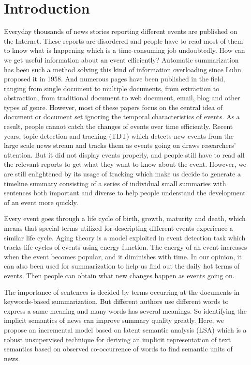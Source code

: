 \documentclass[runningheads,a4paper]{llncs}
\begin{document}
\section{Introduction}

Everyday thousands of news stories reporting different events are published on the Internet. These reports are disordered and people have to read most of them to know what is happening which is a time-consuming job undoubtedly. How can we get useful information about an event efficiently? Automatic summarization has been such a method solving this kind of information overloading since Luhn \cite{1958-Luhn-p159-165} proposed it in 1958. And numerous pages have been published in the field, ranging from single document to multiple documents, from extraction to abstraction, from traditional document to web document, email, blog and other types of genre. However, most of these papers focus on the central idea of document or document set ignoring the temporal characteristics of events. As a result, people cannot catch the changes of events over time efficiently. 
Recent years, topic detection and tracking (TDT) which detects new events from the large scale news stream and tracks them as events going on draws researchers' attention. But it did not display events properly, and people still have to read all the relevant reports to get what they want to know about the event. However, we are still enlightened by its usage of tracking which make us decide to generate a timeline summary consisting of a series of individual small summaries with sentences both important and diverse to help people understand the development of an event more quickly.

Every event goes through a life cycle of birth, growth, maturity and death, which means that special terms utilized for descripting different events experience a similar life cycle. Aging theory \cite{2003-Chen-p47-59} is a model exploited in event detection task which tracks life cycles of events using energy function. The energy of an event increases when the event becomes popular, and it diminishes with time. In our opinion, it can also been used for summarization to help us find out the daily hot terms of events. Then people can obtain what new changes happen as events going on.

The importance of sentences is decided by terms occurring at the documents in keywords-based summarization. But different authors use different words to express a same meaning and many words has several meanings. So identifying the implicit semantics of news can improve summary quality greatly. Here, we propose an incremental model based on latent semantic analysis (LSA) \cite{1990-Deerwester-p391-407} which is a robust unsupervised technique for deriving an implicit representation of text semantics based on observed co-occurrence of words to find semantic units of news.
\end{document}
